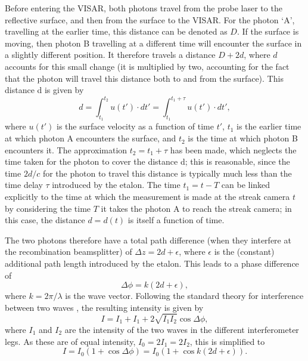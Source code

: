 Before entering the VISAR, both photons travel from the probe laser to the reflective surface, and then from the surface to the VISAR. For the photon `A', travelling at the earlier time, this distance can be denoted as $D$. If the surface is moving, then photon B travelling at a different time will encounter the surface in a slightly different position. It therefore travels a distance $D+2d$, where $d$ accounts for this small change (it is multiplied by two, accounting for the fact that the photon will travel this distance both to and from the surface). This distance d is given by \begin{equation} d = \int_{t_1}^{t_2} u(t') \cdot dt' = \int_{t_1}^{t_1 + \tau} u(t') \cdot dt',\end{equation} where $u(t')$ is the surface velocity as a function of time $t'$, $t_1$ is the earlier time at which photon A encounters the surface, and $t_2$ is the time at which photon B encounters it. The approximation $t_2 = t_1 + \tau$ has been made, which neglects the time taken for the photon to cover the distance d; this is reasonable, since the time $2d/c$ for the photon to travel this distance is typically much less than the time delay $\tau$ introduced by the etalon. The time $t_1 = t - T$ can be linked explicitly to the time at which the measurement is made at the streak camera $t$ by considering the time $T$ it takes the photon A to reach the streak camera; in this case, the distance $d = d(t)$ is itself a function of time.

The two photons therefore have a total path difference (when they interfere at the recombination beamsplitter) of $ \Delta z = 2d + \epsilon $, where $\epsilon$ is the (constant) additional path length introduced by the etalon. This leads to a phase difference of \begin{equation} \Delta\phi = k (2d + \epsilon),\end{equation} where $k = 2\pi / \lambda$ is the wave vector. Following the standard theory for interference between two waves \cite{Hecht2017}, the resulting intensity is given by  \begin{equation}I = I_1 + I_1 + 2\sqrt{I_1 I_2} \cos{\Delta \phi},\end{equation} where $I_1$ and $I_2$ are the intensity of the two waves in the different interferometer legs. As these are of equal intensity, $I_0 = 2 I_1 = 2 I_2$, this is simplified to \begin{equation} I = I_0 (1 + \cos{\Delta \phi}) = I_0 (1 + \cos{k (2d + \epsilon)}).\end{equation}

